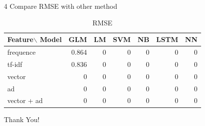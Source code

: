 \documentclass[10pt]{beamer}
\begin{document}
\begin{frame}{4 Compare RMSE with other method}

\begin{table}[]
\centering
\caption*{\huge{RMSE}}

\begin{tabular}{lrrrrrr}
Feature$\backslash$ Model & GLM   & LM & SVM & NB & LSTM & NN \\
\hline
frequence     & 0.864 & 0  & 0   & 0  & 0    & 0  \\
tf-idf        & 0.836 & 0  & 0   & 0  & 0    & 0  \\
vector        & 0     & 0  & 0   & 0  & 0    & 0  \\
ad            & 0     & 0  & 0   & 0  & 0    & 0  \\
vector + ad   & 0     & 0  & 0   & 0  & 0    & 0 \\
\hline
\end{tabular}
\label{table:nonlin} 
\end{table}

\end{frame}


\begin{frame}
\Huge{\centerline{Thank You!}}
\end{frame}
\end{document}

